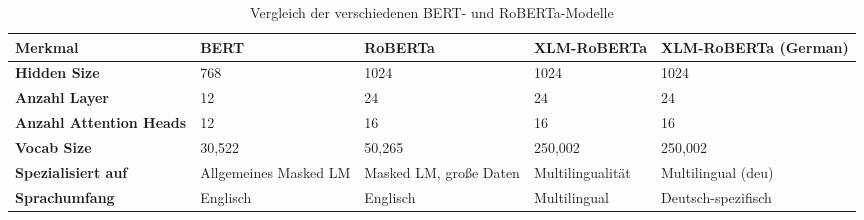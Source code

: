 \begin{sidewaystable}[htbp]
\centering
    \begin{tabular}{|p{3.5cm}|p{2.8cm}|p{2.8cm}|p{2.8cm}|p{2.8cm}|}
        \hline
        \textbf{Merkmal} & \textbf{BERT} & \textbf{RoBERTa} & \textbf{XLM-RoBERTa} & \textbf{XLM-RoBERTa (German)} \\
        \hline
        \textbf{Hidden Size} & 768 & 1024 & 1024 & 1024 \\
        \hline
        \textbf{Anzahl Layer} & 12 & 24 & 24 & 24 \\
        \hline
        \textbf{Anzahl Attention Heads} & 12 & 16 & 16 & 16 \\
        \hline
        \textbf{Vocab Size} & 30,522 & 50,265 & 250,002 & 250,002 \\
        \hline
        \textbf{Spezialisiert auf} & Allgemeines Masked LM & Masked LM, große Daten & Multilingualität & Multilingual (deu) \\
        \hline
        \textbf{Sprachumfang} & Englisch & Englisch & Multilingual & Deutsch-spezifisch \\
        \hline
    \end{tabular}
\caption{Vergleich der verschiedenen BERT- und RoBERTa-Modelle}
\label{tab:bert_models}
\end{sidewaystable}
